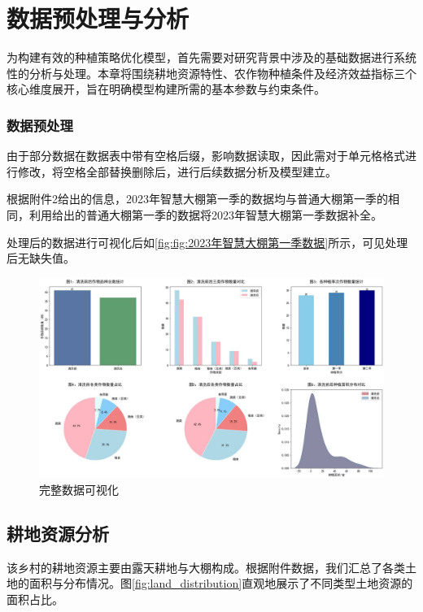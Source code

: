 \section{数据预处理与分析}

为构建有效的种植策略优化模型，首先需要对研究背景中涉及的基础数据进行系统性的分析与处理。本章将围绕耕地资源特性、农作物种植条件及经济效益指标三个核心维度展开，旨在明确模型构建所需的基本参数与约束条件。


\subsubsection{数据预处理}



由于部分数据在数据表中带有空格后缀，影响数据读取，因此需对于单元格格式进行修改，将空格全部替换删除后，进行后续数据分析及模型建立。

根据附件2给出的信息，2023年智慧大棚第一季的数据均与普通大棚第一季的相同，利用给出的普通大棚第一季的数据将2023年智慧大棚第一季数据补全。

处理后的数据进行可视化后如\ref{fig:fig:2023年智慧大棚第一季数据}所示，可见处理后无缺失值。

\begin{figure}[htbp]
    \centering
    \includegraphics[width=\textwidth]{figs/2数据分析与预处理/数据预处理后.jpg}
    \caption{完整数据可视化}
    \label{fig:2023年智慧大棚第一季数据}
\end{figure}

\subsection{耕地资源分析}

该乡村的耕地资源主要由露天耕地与大棚构成。根据附件数据，我们汇总了各类土地的面积与分布情况。图\ref{fig:land_distribution}直观地展示了不同类型土地资源的面积占比。

